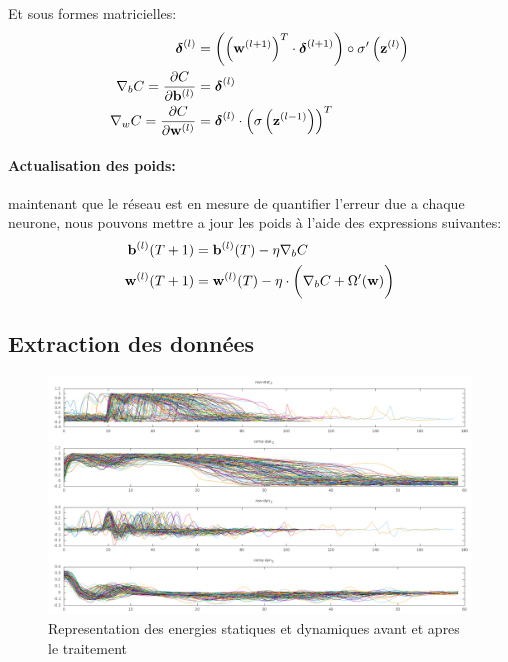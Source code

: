 \documentclass[11pt]{article}
\begin{document}
Et sous formes matricielles:
\begin{equation}
	\begin{aligned}
		\boldsymbol \delta^{(l)} &= \left(\left({\bf w}^{(l+1)} \right)^{T}
		\cdot \boldsymbol \delta^{(l+1)} \right)
		\circ \sigma'\left( {\bf z}^{(l)}\right) \\
		\nabla_bC = \frac{\partial C}{\partial {\bf b}^{(l)}} &=
		\boldsymbol\delta^{(l)}  \\
		\nabla_wC = \frac{\partial C}{\partial {\bf w}^{(l)}} &=
		\boldsymbol\delta^{(l)} \cdot \left(\sigma\left({\bf z}^{(l-1)}\right)\right)^{T}\\
	\end{aligned}
\end{equation}

\paragraph{Actualisation des poids:} maintenant que le r\'eseau est en mesure de
quantifier l'erreur due a chaque neurone, nous pouvons mettre a jour les poids
\`a l'aide des expressions suivantes:
\begin{equation}
	\begin{aligned}
		{\bf b}^{(l)}(T+1) &= {\bf b}^{(l)}(T) - \eta \nabla_bC \\
		{\bf w}^{(l)}(T+1) &= {\bf w}^{(l)}(T) - \eta \cdot \bigg( \nabla_bC + \Omega'({\bf w})\bigg)\\
	\end{aligned}
\end{equation}



\subsection{Extraction des donn\'ees}

\begin{figure}[h]
	\centering
	\includegraphics[scale=.3]{img/preprocessing.png}
	\caption{Representation des energies statiques et dynamiques avant et
	apres le traitement}
\end{figure}
\end{document}
